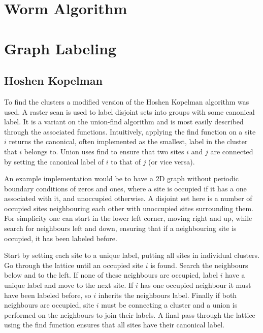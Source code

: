 \section{Worm Algorithm}
\label{sec:WormAlgorithm}


\section{Graph Labeling}
\label{sec:GraphLabeling}

\subsection{Hoshen Kopelman}
\label{subsec:HoshenKopelman}

To find the clusters a modified version of the Hoshen Kopelman algorithm was used. A raster scan is used to label disjoint sets into groups with some canonical label\cite{Hoshen:HKAlgo}. It is a variant on the union-find algorithm and is most easily described through the associated functions. Intuitively, applying the find function on a site $i$ returns the canonical, often implemented as the smallest, label in the cluster that $i$ belongs to. Union uses find to ensure that two sites $i$ and $j$ are connected by setting the canonical label of $i$ to that of $j$ (or vice versa). 

An example implementation would be to have a 2D graph without periodic boundary conditions of zeros and ones, where a site is occupied if it has a one associated with it, and unoccupied otherwise. A disjoint set here is a number of occupied sites neighbouring each other with unoccupied sites surrounding them. For simplicity one can start in the lower left corner, moving right and up, while search for neighbours left and down, ensuring that if a neighbouring site is occupied, it has been labeled before. 

Start by setting each site to a unique label, putting all sites in individual clusters. Go through the lattice until an occupied site $i$ is found. Search the neighbours below and to the left. If none of these neighbours are occupied, label $i$ have a unique label and move to the next site. If $i$ has one occupied neighbour it must have been labeled before, so $i$ inherits the neighbours label. Finally if both neighbours are occupied, site $i$ must be connecting a cluster and a union is performed on the neighbours to join their labels. A final pass through the lattice using the find function ensures that all sites have their canonical label.

